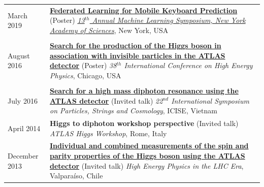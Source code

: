 \documentclass{letter}
\begin{document}
\begin{tabular}{p{}p{}}
  March 2019
  &
  \href{https://arxiv.org/abs/1811.03604}{\textbf{Federated Learning for Mobile Keyboard Prediction}} (Poster) \newline 
  \href{https://www.nyas.org/events/2019/13th-annual-machine-learning-symposium/}{\textit{13$^{th}$ Annual Machine Learning Symposium, New York Academy of Sciences}}, New York, USA \\
  \\

  August 2016
  &
  \href{https://cds.cern.ch/record/2208271}{\textbf{Search for the production of the Higgs boson in association with invisible particles in the ATLAS detector}} (Poster) \newline 
  \textit{38$^{th}$ International Conference on High Energy Physics}, Chicago, USA \\
  \\

  July 2016
  &
  \href{https://cds.cern.ch/record/2199807}{\textbf{Search for a high mass diphoton resonance using the ATLAS detector}} (Invited talk) \newline 
  \textit{22$^{nd}$ International Symposium on Particles, Strings and Cosmology}, ICISE, Vietnam \newline
  \\


  April 2014
  &
  \textbf{Higgs to diphoton workshop perspective} (Invited talk) \newline
  \textit{ATLAS Higgs Workshop}, Rome, Italy \newline
  \\

  December 2013
  &
  \href{https://cds.cern.ch/record/1640386}{\textbf{Individual and combined measurements of the spin and parity properties of the Higgs boson using the ATLAS detector}} (Invited talk) \newline
  \textit{High Energy Physics in the LHC Era}, Valpara\'{i}so, Chile \newline
  \\


\end{tabular}
\end{document}

